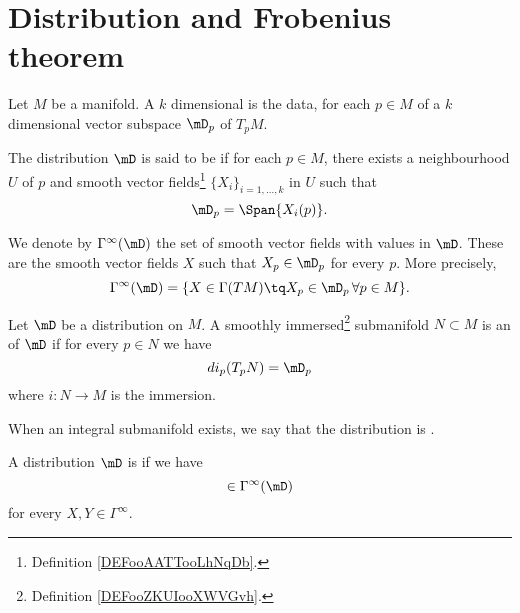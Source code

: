\section{Distribution and Frobenius theorem}

\begin{definition}      \label{DEFooYOMHooZJvsSt}
    Let \( M\) be a manifold. A \( k\) dimensional  is the data, for each \( p\in M\) of a \( k\) dimensional vector subspace \( \mD_p\) of \( T_pM\).

    The distribution \( \mD\) is said to be  if for each \( p\in M\), there exists a neighbourhood \( U\) of \( p\) and smooth vector fields\footnote{Definition \ref{DEFooAATTooLhNqDb}.} \( \{ X_i \}_{i=1,\ldots, k}\) in \( U\) such that
    \begin{equation}
        \mD_p=\Span\{ X_i(p) \}.
    \end{equation}

    We denote by \( \Gamma^{\infty}(\mD) \) the set of smooth vector fields with values in \( \mD\). These are the smooth vector fields \( X\) such that \( X_p\in \mD_p\) for every \( p\). More precisely,
    \begin{equation}
        \Gamma^{\infty}(\mD)=\{ X\in \Gamma(TM)\tq X_p\in\mD_p\,\forall p\in M \}.
    \end{equation}
\end{definition}

\begin{definition}
    Let \( \mD\) be a distribution on \( M\). A smoothly immersed\footnote{Definition \ref{DEFooZKUIooXWVGvh}.} submanifold \( N\subset M\) is an  of \( \mD\) if for every \( p\in N\) we have
    \begin{equation}
        di_p(T_pN)=\mD_p
    \end{equation}
    where \( i\colon N\to M\) is the immersion.

    When an integral submanifold exists, we say that the distribution is .
\end{definition}

\begin{definition}
    A distribution \( \mD\) is  if we have
    \begin{equation}
        [X,Y]\in \Gamma^{\infty}(\mD)
    \end{equation}
    for every \( X,Y\in \Gamma^{\infty}\).
\end{definition}

